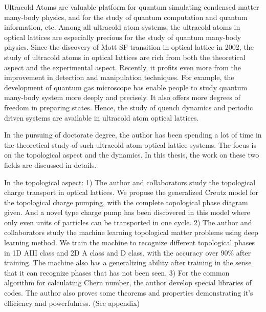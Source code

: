 \begin{eabstract}
Ultracold Atoms are valuable platform for quantum simulating condensed matter many-body physics, and for the study of quantum computation and quantum information, etc. Among all ultracold atom systems, the ultracold atoms in optical lattices are especially precious for the study of quantum many-body physics. Since the discovery of Mott-SF transition in optical lattice in 2002, the study of ultracold atoms in optical lattices are rich from both the theoretical aspect and the experimental aspect. Recently, it profits even more from the improvement in detection and manipulation techniques. For example, the development of quantum gas microscope has enable people to study quantum many-body system more deeply and precisely. It also offers more degrees of freedom in preparing states. Hence, the study of quench dynamics and periodic driven systems are available in ultracold atom optical lattices.

In the pursuing of doctorate degree, the author has been spending a lot of time in the theoretical study of such ultracold atom optical lattice systems. The focus is on the topological aspect and the dynamics. In this thesis, the work on these two fields are discussed in details. 

In the topological aspect:
1) The author and collaborators study the topological charge transport in optical lattices. We propose the generalized Creutz model for the topological charge pumping, with the complete topological phase diagram given. And a novel type charge pump has been discovered in this model where only even units of particles can be transported in one cycle.
2) The author and collaborators study the machine learning topological matter problems using deep learning method. We train the machine to recognize different topological phases in 1D AIII class and 2D A class and D class, with the accuracy over 90\% after training. The machine also has a generalizing ability after training in the sense that it can recognize phases that has not been seen.
3) For the common algorithm for calculating Chern number, the author develop special libraries of codes. The author also proves some theorems and properties demonstrating it's efficiency and powerfulness. (See appendix)


\end{eabstract}

